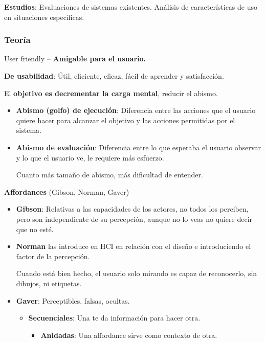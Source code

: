 \documentclass[12pt]{report} %
\begin{document}
\textbf{Estudios}: Evaluaciones de sistemas existentes. Análisis de
características de uso en situaciones específicas.

\subsubsection{Teoría}

User friendly -- \textbf{Amigable para el usuario.}

\textbf{De usabilidad}: Útil, eficiente, eficaz, fácil de aprender y
satisfacción.

El \textbf{objetivo es decrementar la carga mental}, reducir el abismo.

\begin{itemize}
\item
  \textbf{Abismo (golfo) de ejecución}: Diferencia entre las acciones
  que el usuario quiere hacer para alcanzar el objetivo y las acciones
  permitidas por el sistema.
\item
  \textbf{Abismo de evaluación}: Diferencia entre lo que esperaba el
  usuario observar y lo que el usuario ve, le requiere más esfuerzo.

  Cuanto más tamaño de abismo, más dificultad de entender.
\end{itemize}

\textbf{Affordances} (Gibson, Norman, Gaver)

\begin{itemize}
\item
  \textbf{Gibson}: Relativas a las capacidades de los actores, no todos
  los perciben, pero son independiente de su percepción, aunque no lo
  veas no quiere decir que no esté.
\item
  \textbf{Norman} las introduce en HCI en relación con el diseño e
  introduciendo el factor de la percepción.

  Cuando está bien hecho, el usuario solo mirando es capaz de
  reconocerlo, sin dibujos, ni etiquetas.
\item
  \textbf{Gaver}: Perceptibles, falsas, ocultas.

  \begin{itemize}
  
  \item
    \textbf{Secuenciales}: Una te da información para hacer otra.

    \begin{itemize}
    
    \item
      \textbf{Anidadas}: Una affordance sirve como contexto de otra.
    \end{itemize}
  \end{itemize}
\end{itemize}
\end{document}
